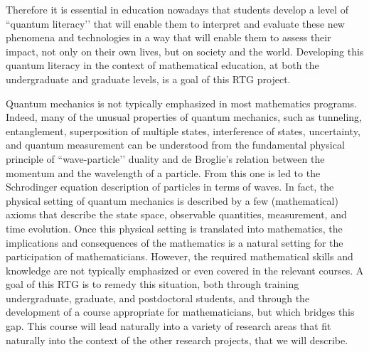 \documentclass[11pt]{article}
\begin{document}
Therefore it is essential in education nowadays that students develop a level of ``quantum literacy’’ \cite{foti2021quantum} that will enable them to interpret and evaluate these new phenomena and technologies in a way that will enable them to assess their impact, not only on their own  lives, but on society and the world. Developing this quantum literacy in the context of mathematical education,    at both the undergraduate and graduate   levels,  is a goal of this RTG project.


Quantum mechanics is not typically emphasized in most mathematics programs.  Indeed, many of the unusual properties of quantum mechanics, such as tunneling, entanglement, superposition of multiple states, interference of states, uncertainty, and quantum measurement can be understood from the fundamental physical principle of ``wave-particle’’ duality and de Broglie’s relation between the momentum and the wavelength of a particle.  From this one is led to the Schr\”odinger equation description of particles in terms of waves. In fact, the physical setting of quantum mechanics is described by a few (mathematical) axioms that describe the state space, observable quantities, measurement, and time evolution.  Once this physical setting is translated into mathematics, the implications and consequences of the mathematics is a natural setting for the participation of mathematicians. However, the required mathematical skills and knowledge are not typically emphasized or even covered in the relevant courses. A goal of this RTG is to remedy this situation, both through training undergraduate, graduate, and postdoctoral students, and through the development of a course appropriate for mathematicians, but which bridges this gap. This course will lead naturally into a variety of research areas that fit naturally into the context of the other research projects, that we will describe.
\end{document}
